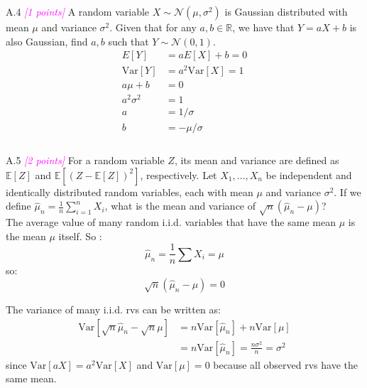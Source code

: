 \documentclass{article}
\newcommand{\field}[1]{\mathbb{#1}}
\newcommand{\1}{\mathbf{1}}
\newcommand{\E}{\mathbb{E}}
\newcommand{\R}{\field{R}} %
\newcommand{\points}[1]{\small\textcolor{magenta}{\emph{[#1 points]}} \normalsize}
\begin{document}
A.4 \points{1} A random variable $X \sim \mathcal{N}(\mu, \sigma^2)$ is Gaussian distributed with mean $\mu$ and variance $\sigma^2$. Given that for any $a,b \in \R$, we have that $Y = aX + b$ is also Gaussian, find $a,b$ such that $Y \sim \mathcal{N}(0,1)$.
\begin{align*}
    E[Y] &= aE[X]+b = 0\\
    \text{Var}[Y] &= a^2\text{Var}[X] = 1\\
    a\mu + b &= 0\\
    a^2\sigma^2 &= 1\\
    a &= 1/\sigma\\
    b &= - \mu/\sigma\\
\end{align*}\\

A.5 \points{2} For a random variable $Z$, its mean and variance are defined as $\E[Z]$ and $\E[(Z-\E[Z])^2]$, respectively. Let $X_1,\dots,X_n$ be independent and identically distributed random variables, each with mean $\mu$ and variance $\sigma^2$. If we define $\widehat{\mu}_n = \frac{1}{n} \sum_{i=1}^n X_i$, what is the mean and variance of $\sqrt{n}(\widehat{\mu}_n - \mu)$? \\

The average value of many random i.i.d. variables that have the same mean $\mu$ is the mean $\mu$ itself. So :
$$\hat\mu_n = \frac{1}{n}\sum X_i = \mu$$
so:
$$\sqrt{n}(\hat\mu_n - \mu) = 0$$

The variance of many i.i.d. rvs can be written as:
\begin{align*}
    \text{Var}[\sqrt n \hat\mu_n - \sqrt n \mu] &= n\text{Var}[\hat\mu_n]+n\text{Var}[\mu] \\
    &= n \text{Var}[\hat\mu_n] = \frac{n\sigma^2}{n} = \sigma^2
\end{align*}
since $\text{Var}[aX]=a^2\text{Var}[X]$ and $\text{Var}[\mu]=0$ because all observed rvs have the same mean.\\
\end{document}
